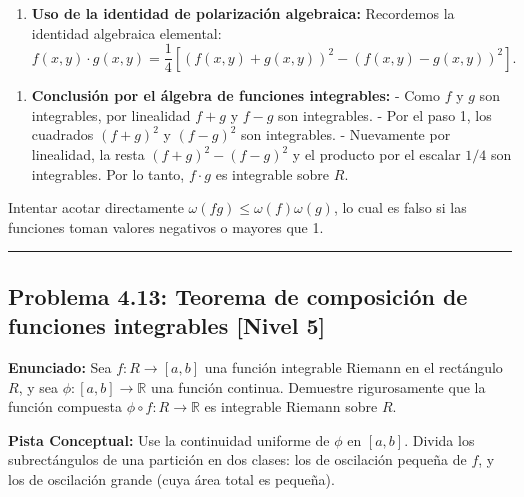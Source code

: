 \documentclass[11pt,a4paper]{article}
\begin{document}
\begin{enumerate}[label=\textbf{\arabic*.}]
\item \textbf{Uso de la identidad de polarización algebraica:}
Recordemos la identidad algebraica elemental:
\begin{equation*}
f(x,y) \cdot g(x,y) = \frac{1}{4} \left[ (f(x,y) + g(x,y))^2 - (f(x,y) - g(x,y))^2 \right].
\end{equation*}
\end{enumerate}

\begin{enumerate}[label=\textbf{\arabic*.}]
\item \textbf{Conclusión por el álgebra de funciones integrables:}
- Como $f$ y $g$ son integrables, por linealidad $f + g$ y $f - g$ son integrables.
- Por el paso 1, los cuadrados $(f+g)^2$ y $(f-g)^2$ son integrables.
- Nuevamente por linealidad, la resta $(f+g)^2 - (f-g)^2$ y el producto por el escalar $1/4$ son integrables.
Por lo tanto, $f \cdot g$ es integrable sobre $R$.
\end{enumerate}

\begin{trapbox}
Intentar acotar directamente $\omega(fg) \le \omega(f)\omega(g)$, lo cual es falso si las funciones toman valores negativos o mayores que 1.
\end{trapbox}

\vspace{0.5cm}
\hrule
\vspace{0.5cm}

\subsection*{Problema 4.13: Teorema de composición de funciones integrables \hfill \color{primaryblue}\small[Nivel 5]}

\begin{tcolorbox}[colback=white,colframe=gray!40,arc=1mm,boxrule=0.5pt,left=3mm,right=3mm,top=2mm,bottom=2mm]
\textbf{Enunciado:} Sea $f: R \to [a,b]$ una función integrable Riemann en el rectángulo $R$, y sea $\phi: [a,b] \to \mathbb{R}$ una función continua. Demuestre rigurosamente que la función compuesta $\phi \circ f: R \to \mathbb{R}$ es integrable Riemann sobre $R$.
\end{tcolorbox}

\begin{tcolorbox}[colback=yellow!4,colframe=accentamber!70,arc=1mm,boxrule=0.5pt,left=3mm,right=3mm,top=1.5mm,bottom=1.5mm]
\textbf{Pista Conceptual:} Use la continuidad uniforme de $\phi$ en $[a,b]$. Divida los subrectángulos de una partición en dos clases: los de oscilación pequeña de $f$, y los de oscilación grande (cuya área total es pequeña).
\end{tcolorbox}
\end{document}

